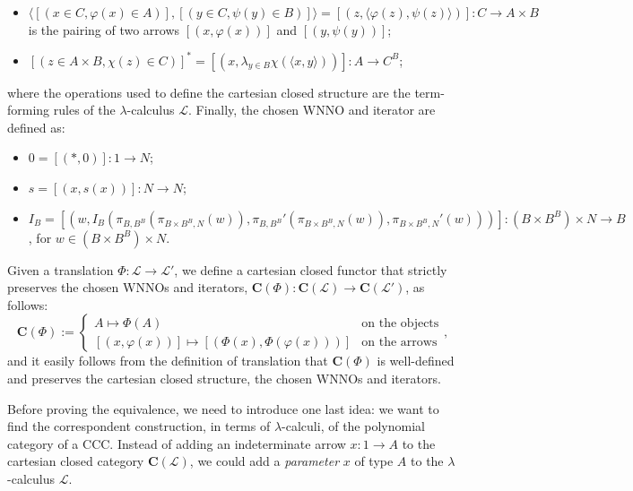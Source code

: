 \begin{definition}
\begin{itemize}
\begin{itemize}[label=$*$]
            \item $\langle [(x \in C,\varphi(x) \in A)],[(y \in C,\psi(y) \in B)] \rangle = [(z,\langle \varphi(z),\psi(z) \rangle)] : C \to A \times B$ is the pairing of two arrows $[(x,\varphi(x))]$ and $[(y,\psi(y))]$;
            \item $[(z \in A \times B,\chi(z) \in C)]^* = [(x,\lambda_{y \in B} \chi(\langle x,y\rangle))] : A \to C^B$;
        \end{itemize}
        where the operations used to define the cartesian closed structure are the term-forming rules of the $\lambda$-calculus $\mathcal L$.
        Finally, the chosen WNNO and iterator are defined as:
        \begin{itemize}[label=$*$]
            \item $0 = [(*,0)] : 1 \to N$;
            \item $s = [(x,s(x))] : N \to N$;
            \item $I_B = [(w,I_B(\pi_{B,B^B}(\pi_{B \times B^B,N}(w)), \pi_{B,B^B}'(\pi_{B \times B^B,N}(w)), \pi_{B \times B^B,N}'(w)))] : (B \times B^B) \times N \to B$, for $w \in (B \times B^B) \times N$.
        \end{itemize}
    \end{itemize}
    Given a translation $\Phi : \mathcal L \to \mathcal L'$, we define a cartesian closed functor that strictly preserves the chosen WNNOs and iterators, $\mathbf C(\Phi) : \mathbf C(\mathcal L) \to \mathbf C(\mathcal L')$, as follows:
    \[ \mathbf C(\Phi) := \begin{cases}
        A \mapsto \Phi(A) & \text{on the objects} \\
        [(x,\varphi(x))] \mapsto [(\Phi(x),\Phi(\varphi(x)))] & \text{on the arrows}
    \end{cases}, \]
    and it easily follows from the definition of translation that $\mathbf C(\Phi)$ is well-defined and preserves the cartesian closed structure, the chosen WNNOs and iterators.
\end{definition}

Before proving the equivalence, we need to introduce one last idea: we want to find the correspondent construction, in terms of $\lambda$-calculi, of the polynomial category of a CCC.\newline
Instead of adding an indeterminate arrow $x : 1 \to A$ to the cartesian closed category $\mathbf C(\mathcal L)$, we could add a \emph{parameter} $x$ of type $A$ to the $\lambda$-calculus $\mathcal L$.

